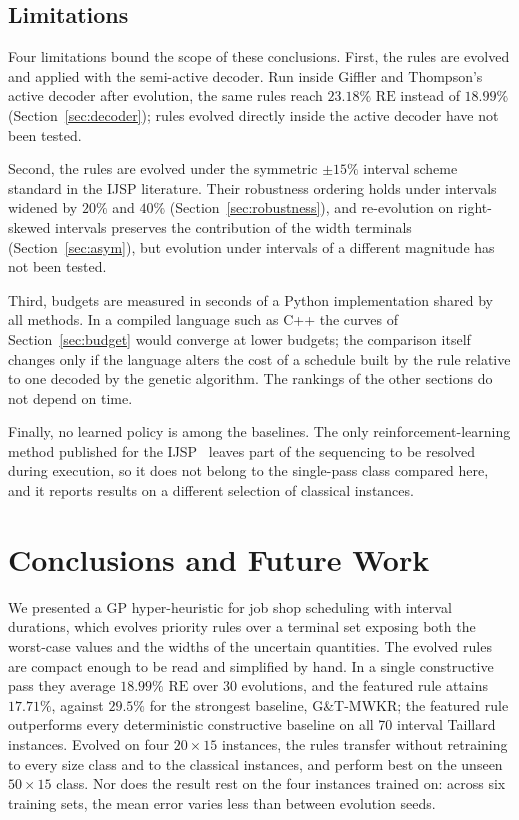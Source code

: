 \documentclass[preprint,number,sort&compress,12pt]{elsarticle}
\newcommand{\RE}{\mathrm{RE}}
\begin{document}
\subsection{Limitations}
\label{sec:limitations}
Four limitations bound the scope of these conclusions. First, the rules
are evolved and applied with the semi-active decoder. Run inside Giffler
and Thompson's active decoder after evolution, the same rules reach
$23.18\%$ $\RE$ instead of $18.99\%$ (Section~\ref{sec:decoder}); rules
evolved directly inside the active decoder have not been tested.

Second, the rules are evolved under the symmetric $\pm15\%$ interval
scheme standard in the IJSP literature. Their robustness ordering holds
under intervals widened by $20\%$ and $40\%$
(Section~\ref{sec:robustness}), and re-evolution on right-skewed
intervals preserves the contribution of the width terminals
(Section~\ref{sec:asym}), but evolution under intervals of a different
magnitude has not been tested.

Third, budgets are measured in seconds of a Python implementation
shared by all methods. In a compiled language such as C++ the curves of
Section~\ref{sec:budget} would converge at lower budgets; the comparison
itself changes only if the language alters the cost of a schedule
built by the rule relative to one decoded by the genetic algorithm. The
rankings of the other sections do not depend on time.

Finally, no learned policy is among the baselines. The only
reinforcement-learning method published for the
IJSP~\citep{Han2026RAPO} leaves part of the sequencing to be resolved
during execution, so it does not belong to the single-pass class
compared here, and it reports results on a different selection of
classical instances.

\section{Conclusions and Future Work}
\label{sec:conclusions}

We presented a GP hyper-heuristic for job shop scheduling with interval
durations, which evolves priority rules over a terminal set exposing
both the worst-case values and the widths of the uncertain quantities.
The evolved rules are compact enough to be read and simplified by hand.
In a single constructive pass they average $18.99\%$ $\RE$ over 30 evolutions,
and the featured rule attains $17.71\%$, against $29.5\%$ for the strongest
baseline, G\&T-MWKR; the featured rule outperforms every deterministic
constructive baseline on all 70 interval Taillard instances. Evolved on four $20{\times}15$
instances, the rules transfer without retraining to every size class and
to the classical instances, and perform best on the unseen
$50{\times}15$ class. Nor does the result rest on the four instances
trained on: across six training sets, the mean error varies less than
between evolution seeds.
\end{document}
